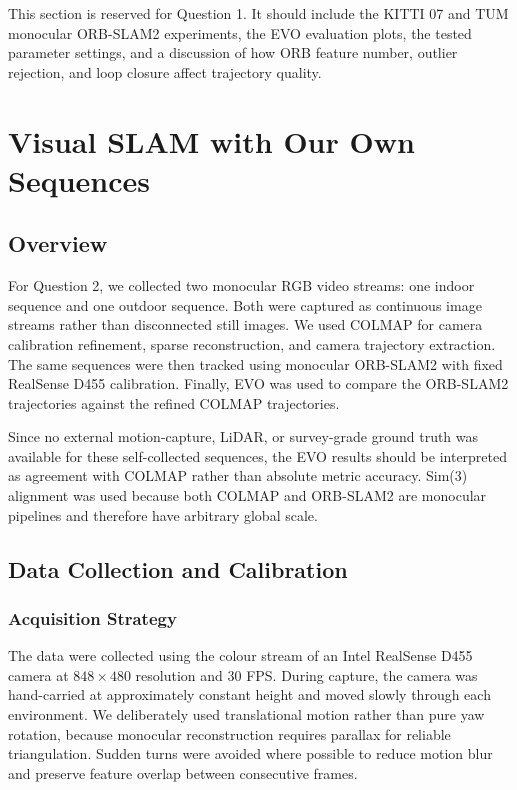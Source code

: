 \documentclass[conference]{IEEEtran}
\begin{document}
This section is reserved for Question 1. It should include the KITTI 07 and TUM monocular ORB-SLAM2 experiments, the EVO evaluation plots, the tested parameter settings, and a discussion of how ORB feature number, outlier rejection, and loop closure affect trajectory quality.

\section{Visual SLAM with Our Own Sequences}
\label{sec:q2_visual_slam}

\subsection{Overview}

For Question 2, we collected two monocular RGB video streams: one indoor sequence and one outdoor sequence. Both were captured as continuous image streams rather than disconnected still images. We used COLMAP for camera calibration refinement, sparse reconstruction, and camera trajectory extraction. The same sequences were then tracked using monocular ORB-SLAM2 with fixed RealSense D455 calibration. Finally, EVO was used to compare the ORB-SLAM2 trajectories against the refined COLMAP trajectories.

Since no external motion-capture, LiDAR, or survey-grade ground truth was available for these self-collected sequences, the EVO results should be interpreted as agreement with COLMAP rather than absolute metric accuracy. Sim(3) alignment was used because both COLMAP and ORB-SLAM2 are monocular pipelines and therefore have arbitrary global scale.

\subsection{Data Collection and Calibration}

\subsubsection{Acquisition Strategy}

The data were collected using the colour stream of an Intel RealSense D455 camera at $848 \times 480$ resolution and 30 FPS. During capture, the camera was hand-carried at approximately constant height and moved slowly through each environment. We deliberately used translational motion rather than pure yaw rotation, because monocular reconstruction requires parallax for reliable triangulation. Sudden turns were avoided where possible to reduce motion blur and preserve feature overlap between consecutive frames.
\end{document}
